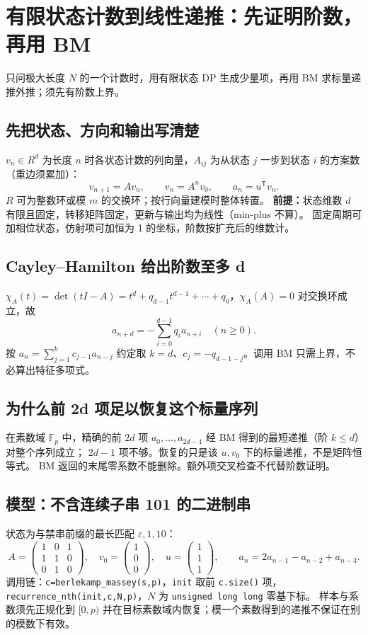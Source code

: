 \section{有限状态计数到线性递推：先证明阶数，再用 BM}\label{knowledge-state-recurrence}
只问极大长度 $N$ 的一个计数时，用有限状态 DP 生成少量项，再用 BM 求标量递推外推；须先有阶数上界。

\subsection{先把状态、方向和输出写清楚}
$v_n\in R^d$ 为长度 $n$ 时各状态计数的列向量，$A_{ij}$ 为从状态 $j$ 一步到状态 $i$ 的方案数（重边须累加）：
\[
v_{n+1}=Av_n,\qquad v_n=A^nv_0,\qquad a_n=u^{\mathsf T}v_n.
\]
$R$ 可为整数环或模 $m$ 的交换环；按行向量建模时整体转置。
\textbf{前提：}状态维数 $d$ 有限且固定，转移矩阵固定，更新与输出均为线性（min-plus 不算）。
固定周期可加相位状态，仿射项可加恒为 1 的坐标，阶数按扩充后的维数计。

\subsection{Cayley--Hamilton 给出阶数至多 d}
$\chi_A(t)=\det(tI-A)=t^d+q_{d-1}t^{d-1}+\cdots+q_0$，$\chi_A(A)=0$ 对交换环成立，故
\[
\boxed{a_{n+d}=-\sum_{i=0}^{d-1}q_i a_{n+i}\quad(n\ge0).}
\]
按 $a_n=\sum_{j=1}^k c_{j-1}a_{n-j}$ 约定取 $k=d$、$c_j=-q_{d-1-j}$。调用 BM 只需上界，不必算出特征多项式。

\subsection{为什么前 2d 项足以恢复这个标量序列}
在素数域 $\mathbb F_p$ 中，精确的前 $2d$ 项 $a_0,\ldots,a_{2d-1}$ 经 BM 得到的最短递推（阶 $k\le d$）对整个序列成立；
$2d-1$ 项不够。恢复的只是该 $u,v_0$ 下的标量递推，不是矩阵恒等式。
BM 返回的末尾零系数不能删除。额外项交叉检查不代替阶数证明。

\subsection{模型：不含连续子串 101 的二进制串}
状态为与禁串前缀的最长匹配 $\varepsilon,1,10$：
\[
A=\begin{pmatrix}1&0&1\\1&1&0\\0&1&0\end{pmatrix},\quad
v_0=\begin{pmatrix}1\\0\\0\end{pmatrix},\quad
u=\begin{pmatrix}1\\1\\1\end{pmatrix},\qquad
a_n=2a_{n-1}-a_{n-2}+a_{n-3}.
\]
调用链：\texttt{c=berlekamp\_massey(s,p)}，\texttt{init} 取前 \texttt{c.size()} 项，
\texttt{recurrence\_nth(init,c,N,p)}，$N$ 为 \texttt{unsigned long long} 零基下标。
样本与系数须先正规化到 $[0,p)$ 并在目标素数域内恢复；模一个素数得到的递推不保证在别的模数下有效。

